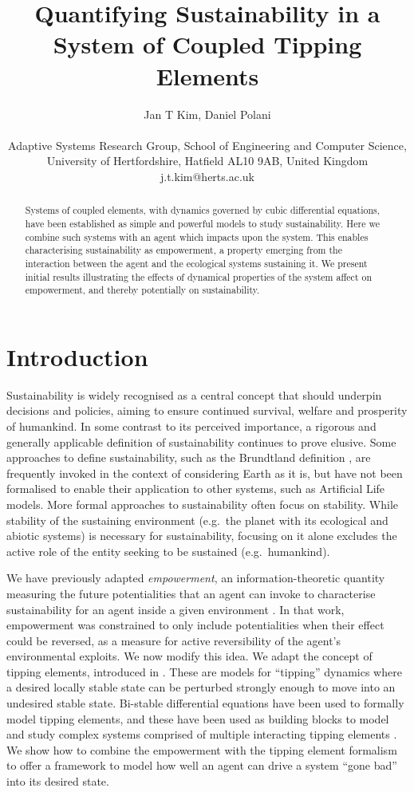 \documentclass[letterpaper]{article}
\title{Quantifying Sustainability in a System of Coupled Tipping Elements}
\author{Jan T Kim, Daniel Polani \\
\mbox{}\\
Adaptive Systems Research Group, School of Engineering and
Computer Science, \\
University of Hertfordshire, Hatfield AL10 9AB,
United Kingdom \\
j.t.kim@herts.ac.uk} %
\begin{document}
\maketitle

\begin{abstract}
Systems of coupled elements, with dynamics governed by cubic
differential equations, have been established as simple and powerful
models to study sustainability. Here we combine such systems with an
agent which impacts upon the system. This enables characterising
sustainability as empowerment, a property emerging from the
interaction between the agent and the ecological systems sustaining
it. We present initial results illustrating the effects of dynamical
properties of the system affect on empowerment, and thereby
potentially on sustainability.
\end{abstract}

\section{Introduction}

Sustainability is widely recognised as a central concept that should
underpin decisions and policies, aiming to ensure continued survival,
welfare and prosperity of humankind. In some contrast to its perceived
importance, a rigorous and generally applicable definition of
sustainability continues to prove elusive. Some approaches to define
sustainability, such as the Brundtland definition
\citep{Brundlandcommission1987}, are frequently invoked in the context
of considering Earth as it is, but have not been formalised to enable
their application to other systems, such as Artificial Life models.
More formal approaches to sustainability often focus on stability.
While stability of the sustaining environment (e.g.\ the planet with
its ecological and abiotic systems) is necessary for
sustainability, focusing on it alone excludes the active role of the
entity seeking to be sustained (e.g.\ humankind).

We have previously adapted \emph{empowerment}, an
information-theoretic quantity measuring the future potentialities
that an agent can invoke to characterise sustainability for an agent
inside a given environment \citep{Kim2009_sustainability}. In that
work, empowerment was constrained to only include potentialities when
their effect could be reversed, as a measure for active reversibility
of the agent's environmental exploits. We now modify this idea. We
adapt the concept of tipping elements, introduced in
\citep{Lenton2008_tippingelements}. These are models for ``tipping''
dynamics where a desired locally stable state can be perturbed strongly
enough to move into an undesired stable state.  Bi-stable differential
equations have been used to formally model tipping elements, and these
have been used as building blocks to model and study complex systems
comprised of multiple interacting tipping elements
\citep{Brummitt2015_coupledcatastrophes,Klose2019_interactingtippingelements}.
We show how to combine the empowerment with the tipping element
formalism to offer a framework to model how well an agent can drive a
system ``gone bad'' into its desired state.
\end{document}
